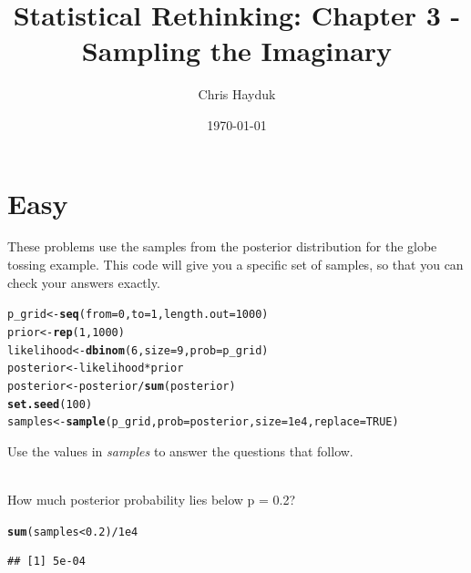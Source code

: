 \documentclass[12pt]{article}\usepackage[]{graphicx}\usepackage[]{color}
\makeatletter
\newcommand{\hlnum}[1]{\textcolor[rgb]{0.686,0.059,0.569}{#1}}%
\newcommand{\hlopt}[1]{\textcolor[rgb]{0,0,0}{#1}}%
\newcommand{\hlstd}[1]{\textcolor[rgb]{0.345,0.345,0.345}{#1}}%
\newcommand{\hlkwb}[1]{\textcolor[rgb]{0.69,0.353,0.396}{#1}}%
\newcommand{\hlkwc}[1]{\textcolor[rgb]{0.333,0.667,0.333}{#1}}%
\newcommand{\hlkwd}[1]{\textcolor[rgb]{0.737,0.353,0.396}{\textbf{#1}}}%
\newenvironment{kframe}{%
 \def\at@end@of@kframe{}%
 \ifinner\ifhmode%
  \def\at@end@of@kframe{\end{minipage}}%
  \begin{minipage}{\columnwidth}%
 \fi\fi%
 \def\FrameCommand##1{\hskip\@totalleftmargin \hskip-\fboxsep
 \colorbox{shadecolor}{##1}\hskip-\fboxsep
     \hskip-\linewidth \hskip-\@totalleftmargin \hskip\columnwidth}%
 \MakeFramed {\advance\hsize-\width
   \@totalleftmargin\z@ \linewidth\hsize
   \@setminipage}}%
 {\par\unskip\endMakeFramed%
 \at@end@of@kframe}
\newenvironment{knitrout}{}{} %
\newenvironment{problem}[2][Problem]{\begin{trivlist}
\item[\hskip \labelsep {\bfseries #1}\hskip \labelsep {\bfseries #2.}]}{\end{trivlist}}
\makeatother
\begin{document}
\title{Statistical Rethinking: Chapter 3 - Sampling the Imaginary}

\author{Chris Hayduk}
\date{\today}

\maketitle




\section{Easy}

These problems use the samples from the posterior distribution for the globe tossing example. This code will give you a specific set of samples, so that you can check your answers exactly.

\begin{knitrout}
\color{fgcolor}\begin{kframe}
\begin{alltt}
\hlstd{p_grid} \hlkwb{<-} \hlkwd{seq}\hlstd{(}\hlkwc{from} \hlstd{=} \hlnum{0}\hlstd{,} \hlkwc{to} \hlstd{=} \hlnum{1}\hlstd{,} \hlkwc{length.out} \hlstd{=} \hlnum{1000}\hlstd{)}
\hlstd{prior} \hlkwb{<-} \hlkwd{rep}\hlstd{(}\hlnum{1}\hlstd{,} \hlnum{1000}\hlstd{)}
\hlstd{likelihood} \hlkwb{<-} \hlkwd{dbinom}\hlstd{(}\hlnum{6}\hlstd{,} \hlkwc{size} \hlstd{=} \hlnum{9}\hlstd{,} \hlkwc{prob} \hlstd{= p_grid)}
\hlstd{posterior} \hlkwb{<-} \hlstd{likelihood} \hlopt{*} \hlstd{prior}
\hlstd{posterior} \hlkwb{<-} \hlstd{posterior} \hlopt{/} \hlkwd{sum}\hlstd{(posterior)}
\hlkwd{set.seed}\hlstd{(}\hlnum{100}\hlstd{)}
\hlstd{samples} \hlkwb{<-} \hlkwd{sample}\hlstd{(p_grid,} \hlkwc{prob} \hlstd{= posterior,} \hlkwc{size} \hlstd{=} \hlnum{1e4}\hlstd{,} \hlkwc{replace} \hlstd{=} \hlnum{TRUE}\hlstd{)}
\end{alltt}
\end{kframe}
\end{knitrout}

Use the values in \textit{samples} to answer the questions that follow.

\begin{problem}{3E1}
\text{}\\
How much posterior probability lies below p = 0.2?
\end{problem}

\begin{knitrout}
\color{fgcolor}\begin{kframe}
\begin{alltt}
\hlkwd{sum}\hlstd{(samples} \hlopt{<} \hlnum{0.2}\hlstd{)} \hlopt{/} \hlnum{1e4}
\end{alltt}
\begin{verbatim}
## [1] 5e-04
\end{verbatim}
\end{kframe}
\end{knitrout}
\end{document}
